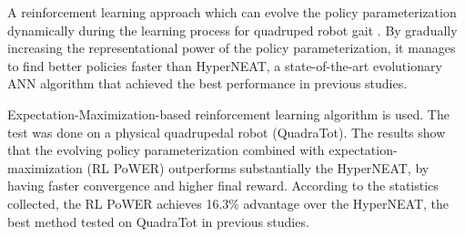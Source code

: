 A reinforcement learning approach which can evolve the policy parameterization dynamically during
the learning process for quadruped robot gait . By gradually increasing the representational
power of the policy parameterization, it manages to find better
policies faster than HyperNEAT, a state-of-the-art evolutionary ANN algorithm that achieved the best performance in previous studies.

Expectation-Maximization-based reinforcement learning algorithm
is used. The test was done on a physical quadrupedal robot (QuadraTot). The results show that the evolving policy parameterization combined with expectation-maximization (RL PoWER)
outperforms substantially the HyperNEAT, by having
faster convergence and higher final
reward. According to the statistics collected, the RL PoWER achieves 16.3\%
advantage over the HyperNEAT, the best method tested on QuadraTot in previous studies.
